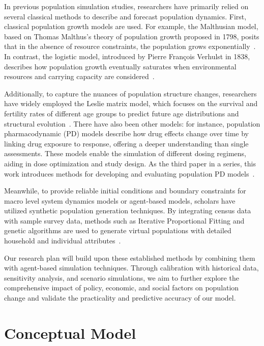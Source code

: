\documentclass[12pt]{article}
\begin{document}
In previous population simulation studies, researchers have primarily relied on several classical methods to describe and forecast population dynamics. First, classical population growth models are used. For example, the Malthusian model, based on Thomas Malthus’s theory of population growth proposed in 1798, posits that in the absence of resource constraints, the population grows exponentially~\cite{malthus1798essay}. In contrast, the logistic model, introduced by Pierre François Verhulst in 1838, describes how population growth eventually saturates when environmental resources and carrying capacity are considered~\cite{verhulst1838logistic}. 

Additionally, to capture the nuances of population structure changes, researchers have widely employed the Leslie matrix model, which focuses on the survival and fertility rates of different age groups to predict future age distributions and structural evolution~\cite{leslie1945matrix}. There have also been other models: for instance, population pharmacodynamic (PD) models describe how drug effects change over time by linking drug exposure to response, offering a deeper understanding than single assessments. These models enable the simulation of different dosing regimens, aiding in dose optimization and study design. As the third paper in a series, this work introduces methods for developing and evaluating population PD models~\cite{maciejewski2013pd}.

Meanwhile, to provide reliable initial conditions and boundary constraints for macro level system dynamics models or agent-based models, scholars have utilized synthetic population generation techniques. By integrating census data with sample survey data, methods such as Iterative Proportional Fitting and genetic algorithms are used to generate virtual populations with detailed household and individual attributes~\cite{beckman1996synthetic}.

Our research plan will build upon these established methods by combining them with agent-based simulation techniques. Through calibration with historical data, sensitivity analysis, and scenario simulations, we aim to further explore the comprehensive impact of policy, economic, and social factors on population change and validate the practicality and predictive accuracy of our model. 

  




\newpage
\section{Conceptual Model}
\end{document}
